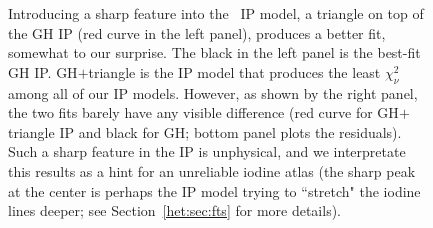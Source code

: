 \begin{figure}
\centering
{}
\caption{Introducing a sharp feature into the \het\ IP model, a
  triangle on top of the GH IP (red curve in the left panel), produces
  a better fit, somewhat to our surprise. The black in the left panel
  is the best-fit GH IP. GH$+$triangle is the IP model that produces
  the least $\chi^2_\nu$ among all of our IP models. However, as shown
  by the right panel, the two fits barely have any visible difference
  (red curve for GH$+$triangle IP and black for GH; bottom panel plots
  the residuals). Such a sharp feature in the IP is unphysical, and we
  interpretate this results as a hint for an unreliable iodine atlas
  (the sharp peak at the center is perhaps the IP model trying to
  ``stretch" the iodine lines deeper; see Section~\ref{het:sec:fts}
  for more details).
\label{het:fig:iodipcomp}}
\end{figure}


